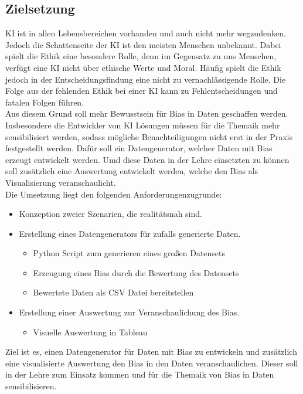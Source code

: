 \begin{onehalfspace}
        \newpage
        \section{Zielsetzung}
        \label{subsec:zielsetzung}
        \ac*{KI} ist in allen Lebensbereichen vorhanden und auch nicht mehr wegzudenken. Jedoch die Schattenseite der \ac*{KI} ist den meisten Menschen unbekannt. Dabei spielt die Ethik eine besondere Rolle, denn im Gegensatz zu uns Menschen, verfügt eine \ac*{KI} nicht über ethische Werte und Moral. Häufig spielt die Ethik jedoch in der Entscheidungsfindung eine nicht zu vernachlässigende Rolle. Die Folge aus der fehlenden Ethik bei einer \ac*{KI} kann zu Fehlentscheidungen und fatalen Folgen führen.
        \\
        Aus diesem Grund soll mehr Bewusstsein für Bias in Daten geschaffen werden. Insbesondere die Entwickler von \ac*{KI} Lösungen müssen für die Themaik mehr sensibilisiert werden, sodass mögliche Benachteiligungen nicht erst in der Praxis festgestellt werden. Dafür soll ein Datengenerator, welcher Daten mit Bias erzeugt entwickelt werden. Umd diese Daten in der Lehre einsetzten zu können soll zusätzlich eine Auswertung entwickelt werden, welche den Bias als Visualisierung veranschaulicht. 
        \\
        Die Umsetzung liegt den folgenden Anforderungenzugrunde:
        \begin{itemize}
            \item Konzeption zweier Szenarien, die realitätsnah sind.
            \item Erstellung eines Datengenerators für zufalls generierte Daten. 
            \begin{itemize}
                \item Python Script zum generieren eines großen Datensets
                \item Erzeugung eines Bias durch die Bewertung des Datensets
                \item Bewertete Daten als CSV Datei bereitstellen
            \end{itemize}
            \item Erstellung einer Auswertung zur Veranschaulichung des Bias.
            \begin{itemize}
                \item Visuelle Auswertung in Tableau
            \end{itemize}
        \end{itemize} 
        Ziel ist es, einen Datengenerator für Daten mit Bias zu entwickeln und zusätzlich eine visualisierte Auswertung den Bias in den Daten veranschaulichen. Dieser soll in der Lehre zum Einsatz kommen und für die Themaik von Bias in Daten sensibilisieren.


\end{onehalfspace}
